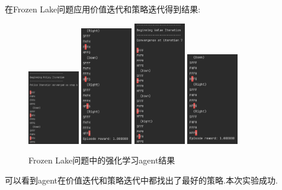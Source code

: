 在Frozen Lake问题应用价值迭代和策略迭代得到结果:

\begin{figure}[H]
    \centering
    \includegraphics[width=0.2\textwidth]{figures/1}
    \hspace{10pt}
    \includegraphics[width=0.2\textwidth]{figures/2}
    \hspace{10pt}
    \includegraphics[width=0.2\textwidth]{figures/3}
    \hspace{10pt}
    \includegraphics[width=0.2\textwidth]{figures/4}
    \caption{Frozen Lake问题中的强化学习agent结果}
\end{figure}

可以看到agent在价值迭代和策略迭代中都找出了最好的策略.本次实验成功.